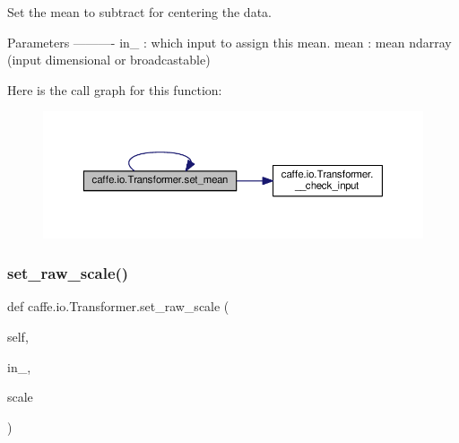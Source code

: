 \begin{DoxyVerb}Set the mean to subtract for centering the data.

Parameters
----------
in_ : which input to assign this mean.
mean : mean ndarray (input dimensional or broadcastable)
\end{DoxyVerb}
 Here is the call graph for this function\+:
\nopagebreak
\begin{figure}[H]
\begin{center}
\leavevmode
\includegraphics[width=350pt]{classcaffe_1_1io_1_1_transformer_a7064401b3aa295a6ab61895563a60d16_cgraph}
\end{center}
\end{figure}
\mbox{\label{classcaffe_1_1io_1_1_transformer_aa02e06527de8f0e02d3065bf83b875a9}} 
\subsubsection{\texorpdfstring{set\+\_\+raw\+\_\+scale()}{set\_raw\_scale()}\hspace{0.1cm}{\footnotesize\ttfamily [1/2]}}
{\footnotesize\ttfamily def caffe.\+io.\+Transformer.\+set\+\_\+raw\+\_\+scale (\begin{DoxyParamCaption}\item[{}]{self,  }\item[{}]{in\+\_\+,  }\item[{}]{scale }\end{DoxyParamCaption})}

